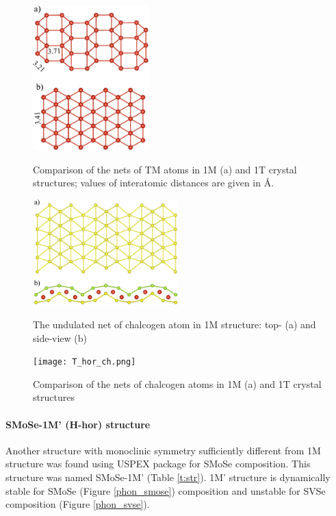 \documentclass[a4paperm]{article}
\begin{document}
\begin{figure}[H]
	\includegraphics[width=0.4\textwidth]{T_hor_V.png} \\
	\caption{Comparison of the nets of TM atoms in 1M (a) and 1T crystal structures; values of interatomic distances are given in \AA.}
	\label{T_hor_V}
\end{figure}

\begin{figure}[H]
        \includegraphics[width=0.5\textwidth]{T_hor_hcb.png} \\
        \caption{The undulated net of chalcogen atom in 1M structure: top- (a) and side-view (b)}
\label{T_hor_hcb}
\end{figure}


\begin{figure}[H]
	\texttt{[image: T\_hor\_ch.png]} \\
	\caption{Comparison of the nets of chalcogen atoms in 1M (a) and 1T crystal structures }
	\label{T_hor_ch}
\end{figure}


\paragraph{SMoSe-1M' (H-hor) structure}
Another structure with monoclinic symmetry sufficiently different from 1M structure was found using USPEX package for SMoSe composition.
This structure was named SMoSe-1M' (Table \ref{t:str}).
1M' structure is dynamically stable for SMoSe (Figure \ref{phon_smose}) composition and unstable for SVSe composition (Figure \ref{phon_svse}).
\end{document}
